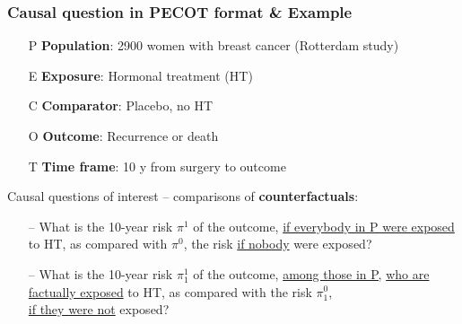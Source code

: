 \documentclass[12pt,dvipsnames,t,aspectratio=169, handout%
]{beamer}
\begin{document}
\begin{frame}
\frametitle{Causal question in PECOT format \& Example}

\begin{itemize}
\item[P] \textbf{Population}: 2900 women with breast cancer (Rotterdam study) 
\medskip
\item[E] \textbf{Exposure}: Hormonal treatment (HT)
\medskip
\item[C] \textbf{Comparator}: Placebo, no HT
\medskip
\item[O] \textbf{Outcome}: Recurrence or death
\medskip
\item[T] \textbf{Time frame}: 10 y from surgery to outcome
\end{itemize}

\pause

Causal questions of interest -- comparisons of \textbf{counterfactuals}:

\begin{itemize}
\item[--] What is the 10-year risk $\pi^1$ of the outcome,
\underline{if everybody in P were exposed} to HT, as compared with $\pi^0$, the risk
\underline{if nobody} were exposed?
\pause
\medskip
\item[--] What is the 10-year risk $\pi^1_1$ of the outcome,
\underline{among those in P,} \underline{who are factually exposed} to HT, as compared with the risk $\pi^0_1$, \\
\underline{if they were not} exposed?
\end{itemize}


\end{frame}
\end{document}
